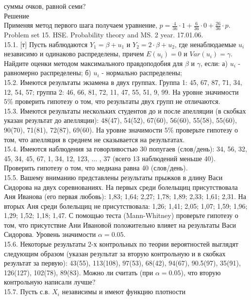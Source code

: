 \documentclass[pdftex,12pt,a4paper]{article}
\begin{document}
суммы очков, равной семи? \\
Решение \\
Применяя метод первого шага получаем уравнение,
$p=\frac{4}{36}\cdot 1+\frac{6}{36}\cdot 0 + \frac{26}{36} \cdot
p$. \\
\newpage
Problem set 15. HSE. Probability theory and MS. 2 year. 17.01.06.\\
15.1. [т] Пусть наблюдаются $Y_{1}=\beta+u_{1}$ и
$Y_{2}=2\cdot\beta+u_{2}$, где ненаблюдаемые $u_{i}$ независимо и
одинаково распределены, причем $E(u_{i})=0$ и $Var(u_{i})=\gamma$.
Найдите оценки методом максимального правдоподобия для $\beta$ и
$\gamma$, если: а)
$u_{i}$ - равномерно распределены; б) $u_{i}$ - нормально распределены; \\
15.2. Имеются результаты экзамена в двух группах. Группа 1: 45,
67, 87, 71, 34, 12, 54, 57; группа 2: 46, 66, 81, 72, 11, 47, 55,
51, 9, 99. На уровне значимости $5\%$ проверить гипотезу о том,
что результаты двух групп не отличаются. \\
15.3. Имеются результаты нескольких студентов до и после апелляции
(в скобках указан результат до апелляции):  48(47), 54(52),
67(60), 56(60), 55(58), 55(60), 90(70), 71(81), 72(87), 69(60). На
уровне значимости $5\%$ проверьте гипотезу о том, что апелляция
в среднем не сказывается на результатах. \\
15.4. Имеются наблюдения за говорливостью 30 попугаев (слов/день):
34, 56, 32, 45, 34, 45, 67, 1, 34, 12, 123, ... , 37 (всего 13
наблюдений меньше 40). Проверить гипотезу о том, что медиана равна
40 (слов/день). \\
15.5. Вашему вниманию представлены результаты прыжков в длину Васи
Сидорова на двух соревнованиях. На первых среди болельщиц
присутствовала Аня Иванова (его первая любовь): 1,83; 1,64; 2,27;
1,78; 1,89; 2,33; 1,61; 2,31. На вторых Аня среди болельщиц не
присутствовала: 1,26; 1,41; 2,05; 1,07; 1,59; 1,96; 1,29; 1,52;
1,18; 1,47. С помощью теста (Mann-Whitney) проверьте гипотезу о
том, что присутствие Ани Ивановой положительно влияет на
результаты Васи Сидорова. Уровень значимости $\alpha=0.05$. \\
15.6. Некоторые результаты 2-х контрольных по теории вероятностей
выглядят следующим образом (указан результат за вторую контрольную
и в скобках результат за первую): 43(55), 113(108), 97(53),
68(42), 94(67), 90.5(97), 35(91), 126(127), 102(78), 89(83). Можно
ли считать (при $\alpha=0.05$), что вторую контрольную написали
лучше? \\
15.7. Пусть с.в. $X_{i}$ независимы и имеют функцию плотности
\end{document}
